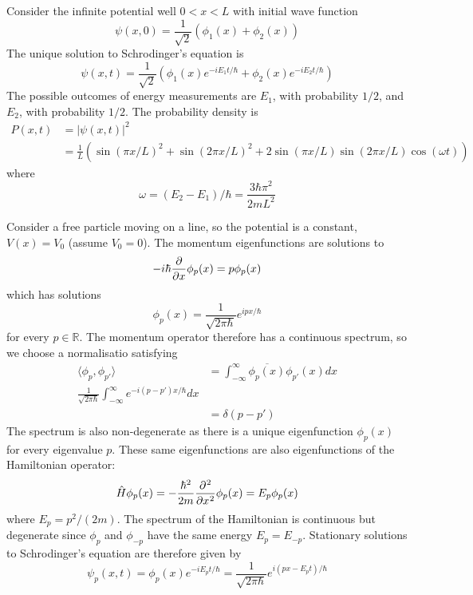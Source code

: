 \begin{example}
	Consider the infinite potential well $0 < x < L$ with initial wave function
	\[
		\psi(x, 0) = \frac{1}{\sqrt{2}} (\phi_1(x) + \phi_2(x))
	\]
	The unique solution to Schrodinger's equation is
	\[
		\psi(x, t) = \frac{1}{\sqrt{2}} (\phi_1(x) e^{-iE_1 t / \hbar} + \phi_2(x) e^{-iE_2 t / \hbar})
	\]
	The possible outcomes of energy measurements are $E_1$, with probability $1 / 2$, and $E_2$, with probability $1 / 2$. The probability density is
	\[
		\begin{aligned}
			P(x, t) & = |\psi(x, t)|^2 \\
			& = \frac{1}{L} \left( {\sin (\pi x / L)}^2 + {\sin (2 \pi x / L)}^2 + 2\sin(\pi x / L) \sin(2 \pi x / L) \cos(\omega t) \right)
		\end{aligned}
	\]
	where
	\[
		\omega = (E_2 - E_1) / \hbar = \frac{3\hbar\pi^2}{2mL^2}
	\]
\end{example}

\begin{example}
	Consider a free particle moving on a line, so the potential is a constant, $V(x) = V_0$ (assume $V_0 = 0$). The momentum eigenfunctions are solutions to
	\[
		-i\hbar\diffp{}{x} \phi_p(x) = p \phi_p(x)
	\]
	which has solutions
	\[
		\phi_p(x) = \frac{1}{\sqrt{2\pi\hbar}} e^{ipx/\hbar}
	\]
	for every $p \in \mathbb{R}$. The momentum operator therefore has a continuous spectrum, so we choose a normalisatio satisfying
	\[
		\begin{aligned}
			\langle \phi_p, \phi_{p'} \rangle & = \int_{-\infty}^{\infty} \overline{\phi_p(x)} \phi_{p'}(x) dx \\
			\frac{1}{\sqrt{2\pi\hbar}} \int_{-\infty}^{\infty} e^{-i(p - p')x / \hbar} dx \\
            & = \delta(p - p')
		\end{aligned}
	\]
    The spectrum is also non-degenerate as there is a unique eigenfunction $\phi_p(x)$ for every eigenvalue $p$. These same eigenfunctions are also eigenfunctions of the Hamiltonian operator:
    \[
        \hat{H} \phi_p(x) = -\frac{\hbar^2}{2m}\diffp[2]{}{x} \phi_p(x) = E_p \phi_p(x)
    \]
    where $E_p = p^2 / (2m)$. The spectrum of the Hamiltonian is continuous but degenerate since $\phi_p$ and $\phi_{-p}$ have the same energy $E_p = E_{-p}$. Stationary solutions to Schrodinger's equation are therefore given by
    \[
        \psi_p(x, t) = \phi_p(x) e^{-iE_p t / \hbar} = \frac{1}{\sqrt{2\pi\hbar}} e^{i(px - E_p t) / \hbar}
    \]
\end{example}

